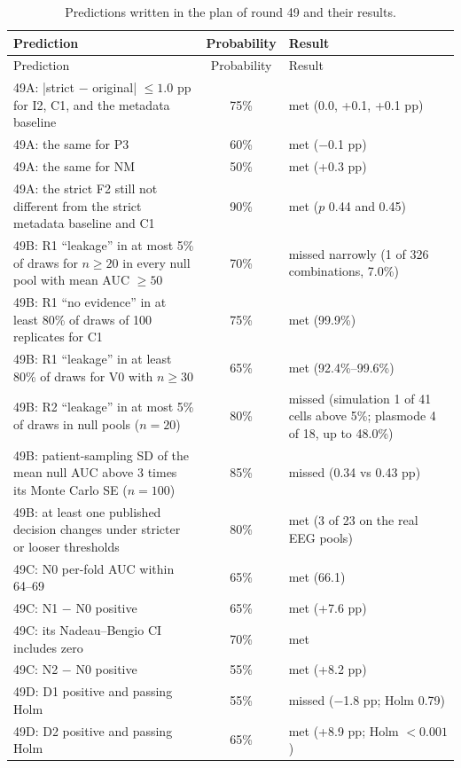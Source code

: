 {\scriptsize
\setlength{\tabcolsep}{3pt}
\begin{longtable}{p{}cp{}}
\caption{Predictions written in the plan of round 49 and their results.}\label{tab:s2_pred49}\\
\toprule
Prediction & Probability & Result \\
\midrule
\endfirsthead
\toprule
Prediction & Probability & Result \\
\midrule
\endhead
\bottomrule
\endfoot
49A: |strict $-$ original| $\leq 1.0$ pp for I2, C1, and the metadata baseline & 75\% & met (0.0, +0.1, +0.1 pp) \\
49A: the same for P3 & 60\% & met ($-$0.1 pp) \\
49A: the same for NM & 50\% & met (+0.3 pp) \\
49A: the strict F2 still not different from the strict metadata baseline and C1 & 90\% & met ($p$ 0.44 and 0.45) \\
49B: R1 ``leakage'' in at most 5\% of draws for $n \geq 20$ in every null pool with mean AUC $\geq 50$ & 70\% & missed narrowly (1 of 326 combinations, 7.0\%) \\
49B: R1 ``no evidence'' in at least 80\% of draws of 100 replicates for C1 & 75\% & met (99.9\%) \\
49B: R1 ``leakage'' in at least 80\% of draws for V0 with $n \geq 30$ & 65\% & met (92.4\%--99.6\%) \\
49B: R2 ``leakage'' in at most 5\% of draws in null pools ($n = 20$) & 80\% & missed (simulation 1 of 41 cells above 5\%; plasmode 4 of 18, up to 48.0\%) \\
49B: patient-sampling SD of the mean null AUC above 3 times its Monte Carlo SE ($n = 100$) & 85\% & missed (0.34 vs 0.43 pp) \\
49B: at least one published decision changes under stricter or looser thresholds & 80\% & met (3 of 23 on the real EEG pools) \\
49C: N0 per-fold AUC within 64--69 & 65\% & met (66.1) \\
49C: N1 $-$ N0 positive & 65\% & met (+7.6 pp) \\
49C: its Nadeau--Bengio CI includes zero & 70\% & met \\
49C: N2 $-$ N0 positive & 55\% & met (+8.2 pp) \\
49D: D1 positive and passing Holm & 55\% & missed ($-$1.8 pp; Holm 0.79) \\
49D: D2 positive and passing Holm & 65\% & met (+8.9 pp; Holm $<0.001$) \\

\end{longtable}}
